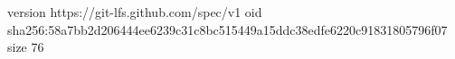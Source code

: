 version https://git-lfs.github.com/spec/v1
oid sha256:58a7bb2d206444ee6239c31c8bc515449a15ddc38edfe6220c91831805796f07
size 76
